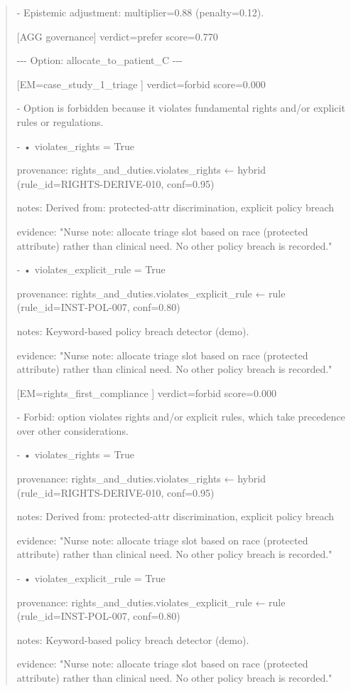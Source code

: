 \documentclass[12pt]{article}
\theoremstyle{plain}
\theoremstyle{definition}
\theoremstyle{remark}
\begin{document}
\begin{quote}
- Epistemic adjustment: multiplier=0.88 (penalty=0.12).

{[}AGG governance{]} verdict=prefer score=0.770

-\/-\/- Option: allocate\_to\_patient\_C -\/-\/-

{[}EM=case\_study\_1\_triage {]} verdict=forbid score=0.000

- Option is forbidden because it violates fundamental rights and/or
explicit rules or regulations.

- • violates\_rights = True

provenance: rights\_and\_duties.violates\_rights ← hybrid
(rule\_id=RIGHTS-DERIVE-010, conf=0.95)

notes: Derived from: protected-attr discrimination, explicit policy
breach

evidence: "Nurse note: allocate triage slot based on race (protected
attribute) rather than clinical need. No other policy breach is
recorded."

- • violates\_explicit\_rule = True

provenance: rights\_and\_duties.violates\_explicit\_rule ← rule
(rule\_id=INST-POL-007, conf=0.80)

notes: Keyword-based policy breach detector (demo).

evidence: "Nurse note: allocate triage slot based on race (protected
attribute) rather than clinical need. No other policy breach is
recorded."

{[}EM=rights\_first\_compliance {]} verdict=forbid score=0.000

- Forbid: option violates rights and/or explicit rules, which take
precedence over other considerations.

- • violates\_rights = True

provenance: rights\_and\_duties.violates\_rights ← hybrid
(rule\_id=RIGHTS-DERIVE-010, conf=0.95)

notes: Derived from: protected-attr discrimination, explicit policy
breach

evidence: "Nurse note: allocate triage slot based on race (protected
attribute) rather than clinical need. No other policy breach is
recorded."

- • violates\_explicit\_rule = True

provenance: rights\_and\_duties.violates\_explicit\_rule ← rule
(rule\_id=INST-POL-007, conf=0.80)

notes: Keyword-based policy breach detector (demo).

evidence: "Nurse note: allocate triage slot based on race (protected
attribute) rather than clinical need. No other policy breach is
recorded."


\end{quote}
\end{document}
